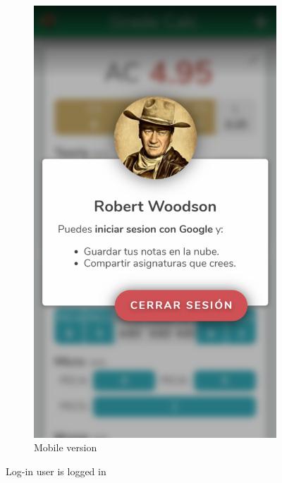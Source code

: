 \begin{figure}[ht!]
\begin{subfigure}[b]{0.243\textwidth-0.1cm}
        \includegraphics[width=\textwidth]{media/screenshots/screenshot-login-logout.png}
        \caption{Mobile version}
    \end{subfigure}
    \caption{Log-in user is logged in}
    \label{fig:login-logout}
\end{figure}
\vfill


